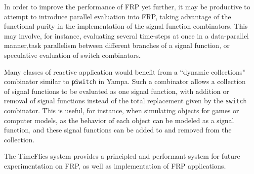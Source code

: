 In order to improve the performance of FRP yet further, it may be productive to attempt
to introduce parallel evaluation into FRP, taking advantage of the functional purity in
the implementation of the signal function combinators. This may involve, for instance,
evaluating several time-steps at once in a data-parallel manner,task parallelism
between different branches of a signal function, or speculative evaluation of switch
combinators.

Many classes of reactive application would benefit from a ``dynamic collections'' combinator
similar to {\tt pSwitch} in Yampa. Such a combinator allows a collection of signal functions
to be evaluated as one signal function, with addition or removal of signal functions instead
of the total replacement given by the {\tt switch} combinator. This is useful, for instance,
when simulating objects for games or computer models, as the behavior of each object can be
modeled as a signal function, and these signal functions can be added to and removed from the
collection.

The TimeFlies system provides a principled and performant system for future experimentation
on FRP, as well as implementation of FRP applications.
